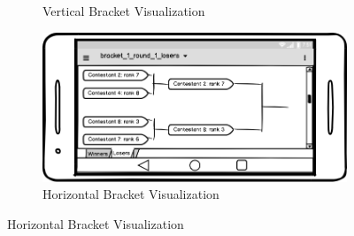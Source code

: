 \documentclass{article}
\begin{document}
\begin{figure}[!htb]
\begin{subfigure}{0.3\textwidth}
        \caption{Vertical Bracket Visualization} \label{fig:x_c}
    \end{subfigure}
    \begin{subfigure}{1\textwidth}
        \includegraphics[width=\linewidth]{figs/bracket_1_round_2_losers.png}
        \caption{Horizontal Bracket Visualization} \label{fig:x_c}
    \end{subfigure}
\end{figure}

{}

\end{document}
